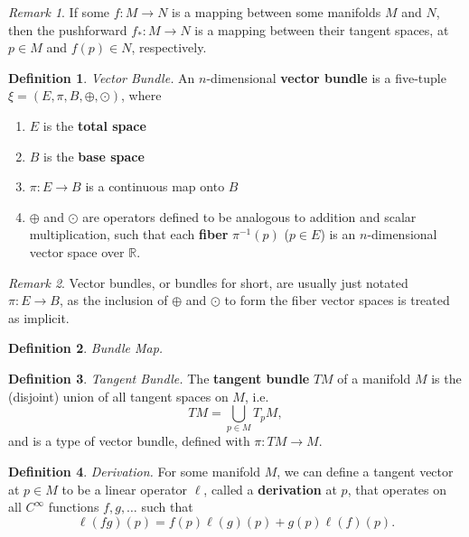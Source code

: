 \documentclass[10pt,landscape]{article}
\theoremstyle{definition}
\newtheorem{definition}{Definition}[section]
\theoremstyle{theorem}
\theoremstyle{summary}
\theoremstyle{remark}
\newtheorem*{remark}{Remark}
\newcommand{\R}{\mathbb{R}}
\newcommand{\Ci}{C^\infty}
\begin{document}
\begin{multicols*}{3}
\begin{remark}
    If some $f:M\rightarrow N$ is a mapping between some manifolds $M$ and $N$, then the pushforward $f_*:M\rightarrow N$ is a mapping between their tangent spaces, at $p\in M$ and $f(p)\in N$, respectively.
\end{remark}

\theoremstyle{definition}
\begin{definition}{\textit{Vector Bundle.}}
    An $n$-dimensional \textbf{vector bundle} is a five-tuple $\xi=(E,\pi,B,\oplus, \odot)$, where
    \begin{enumerate}
        \item $E$ is the \textbf{total space}
        \item $B$ is the \textbf{base space}
        \item $\pi:E\rightarrow B$ is a continuous map onto $B$
        \item $\oplus$ and $\odot$ are operators defined to be analogous to addition and scalar multiplication, such that each \textbf{fiber} $\pi^{-1}(p)$ ($p\in E$) is an $n$-dimensional vector space over $\R$.
    \end{enumerate}
    \end{definition}
    
    \begin{remark}
    Vector bundles, or bundles for short, are usually just notated $\pi: E\rightarrow B$, as the inclusion of $\oplus$ and $\odot$ to form the fiber vector spaces is treated as implicit.
    \end{remark}


\theoremstyle{definition}
\begin{definition}{\textit{Bundle Map.}}

\end{definition}

\theoremstyle{definition}
\begin{definition}{\textit{Tangent Bundle.}}
    The \textbf{tangent bundle} $TM$ of a manifold $M$ is the (disjoint) union of all tangent spaces on $M$, i.e.
    \begin{equation}
        TM = \bigcup_{p\in M}T_pM,
    \end{equation}
    and is a type of vector bundle, defined with $\pi: TM \rightarrow M$.
\end{definition}

\theoremstyle{definition}
\begin{definition}{\textit{Derivation.}}
    For some manifold $M$, we can define a tangent vector at $p\in M$ to be a linear operator $\ell$, called a \textbf{derivation} at $p$, that operates on all $\Ci$ functions $f,g,\ldots$ such that
    \begin{equation}
        \ell(fg)(p) = f(p)\ell(g)(p) + g(p)\ell(f)(p).
    \end{equation}
\end{definition}


\end{multicols*}
\end{document}
